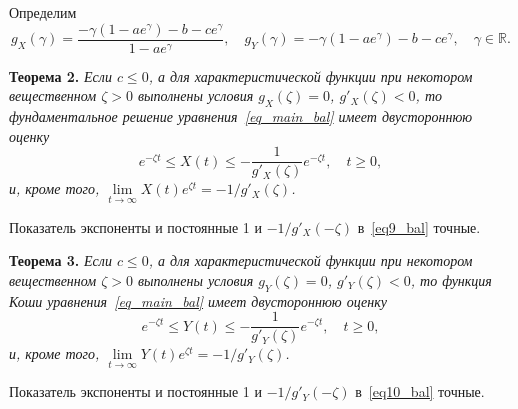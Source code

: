 Определим
$$
g_X(\gamma) = \frac{-\gamma(1 - a{e^{\gamma}}) - b - c{e^{\gamma}}}{1-ae^{\gamma}},\quad g_Y(\gamma) =-\gamma(1 - a{e^{\gamma}}) - b - ce^{\gamma},\quad \gamma \in \mathbb{R}.
$$

{\bf Теорема 2.}
{\it
Если $c\le0$, а для характеристической функции при некотором вещественном $\zeta>0$ выполнены условия $g_X(\zeta)=0$, $g'_X(\zeta)<0$, то фундаментальное решение уравнения~\eqref{eq_main_bal} имеет двустороннюю оценку
\begin{equation}
\label{eq9_bal}
e^{-\zeta t}\le X(t)\le -\frac1{g'_X(\zeta)}e^{-\zeta t},\quad t\ge 0,
\end{equation}
и, кроме того, $\lim\limits_{t\to\infty}X(t)e^{\zeta t}=-1/{g'_X(\zeta)}$.
}

Показатель экспоненты и постоянные 1 и $-1/{g'_X(-\zeta)}$ в~\eqref{eq9_bal} точные.

{\bf Теорема 3.}
{\it
Если $c\le0$, а для характеристической функции при некотором вещественном $\zeta>0$ выполнены условия $g_Y(\zeta)=0$, $g'_Y(\zeta)<0$, то функция Коши уравнения~\eqref{eq_main_bal} имеет двустороннюю оценку
\begin{equation}
\label{eq10_bal}
e^{-\zeta t}\le Y(t)\le -\frac1{g'_Y(\zeta)}e^{-\zeta t},\quad t\ge 0,
\end{equation}
и, кроме того, $\lim\limits_{t\to\infty}Y(t)e^{\zeta t}=-1/{g'_Y(\zeta)}$.
}

Показатель экспоненты и постоянные 1 и $-1/{g'_Y(-\zeta)}$ в~\eqref{eq10_bal} точные.




